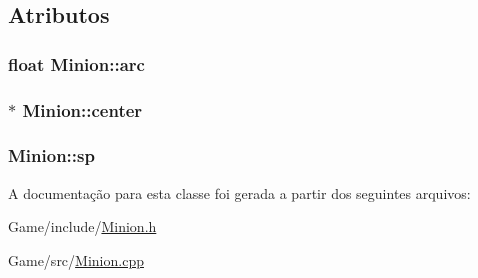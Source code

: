 \subsection{Atributos}
\hypertarget{classMinion_a32bbf5d39ca2f909c19c0ff9141336be}{
\subsubsection[{arc}]{\setlength{\rightskip}{0pt plus 5cm}float Minion\+::arc\hspace{0.3cm}{\ttfamily [private]}}}\label{classMinion_a32bbf5d39ca2f909c19c0ff9141336be}
\hypertarget{classMinion_aec145adaab9c6ecfb35b7ec1624ab111}{
\subsubsection[{center}]{$\ast$ Minion\+::center\hspace{0.3cm}{\ttfamily [private]}}}\label{classMinion_aec145adaab9c6ecfb35b7ec1624ab111}
\hypertarget{classMinion_a691b1b9f494fcd1f0b8c04c28ab3fa36}{
\subsubsection[{sp}]{ Minion\+::sp\hspace{0.3cm}{\ttfamily [private]}}}\label{classMinion_a691b1b9f494fcd1f0b8c04c28ab3fa36}


A documentação para esta classe foi gerada a partir dos seguintes arquivos\+:\begin{DoxyCompactItemize}
\item 
Game/include/\hyperlink{Minion_8h}{Minion.\+h}\item 
Game/src/\hyperlink{Minion_8cpp}{Minion.\+cpp}\end{DoxyCompactItemize}
